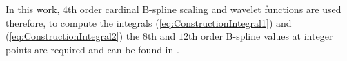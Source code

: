 \documentclass[journal,a4paper]{IEEEtran}
\begin{document}
In this work, 4th order cardinal B-spline scaling and wavelet functions are used therefore, to compute the integrals (\ref{eq:ConstructionIntegral1}) and (\ref{eq:ConstructionIntegral2})  the $8$th and $12$th order B-spline values at integer points are  required and can be found in \cite{Goswami1999}.
\end{document}
